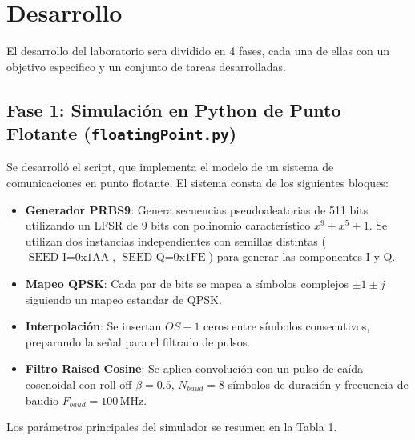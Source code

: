 \documentclass[11pt,a4paper]{article}
\begin{document}
\section{Desarrollo}

El desarrollo del laboratorio sera dividido en 4 fases, cada una de ellas con
un objetivo especifico y un conjunto de tareas desarrolladas.

\subsection{Fase 1: Simulación en Python de Punto Flotante (\texttt{floatingPoint.py})}

Se desarrolló el script, que implementa el modelo de un sistema de
comunicaciones en punto flotante. El sistema consta de los siguientes bloques:

\begin{itemize}
    \item \textbf{Generador PRBS9}: Genera secuencias pseudoaleatorias de 511 bits
          utilizando un LFSR de 9 bits con polinomio
          característico $x^9 + x^5 + 1$. Se utilizan dos instancias
          independientes con semillas distintas ($\text{SEED\_I} = \text{0x1AA}$,
          $\text{SEED\_Q} = \text{0x1FE}$) para generar las componentes I y Q.
    \item \textbf{Mapeo QPSK}: Cada par de bits se mapea a símbolos complejos $\pm 1\pm j$ siguiendo un mapeo estandar de QPSK.\@
    \item \textbf{Interpolación}: Se insertan $OS - 1$ ceros entre símbolos
          consecutivos, preparando la señal para el filtrado de pulsos.
    \item \textbf{Filtro Raised Cosine}: Se aplica convolución con un pulso
          de caída cosenoidal con roll-off $\beta = 0.5$, $N_{baud} = 8$
          símbolos de duración y frecuencia de baudio $F_{baud} = 100$\,MHz.
\end{itemize}

Los parámetros principales del simulador se resumen en la Tabla 1.
\end{document}
